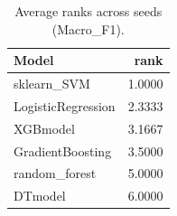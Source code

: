 \begin{table}[t]
\centering
\begin{tabular}{lr}
\toprule
Model & rank \\
\midrule
sklearn_SVM & 1.0000 \\
LogisticRegression & 2.3333 \\
XGBmodel & 3.1667 \\
GradientBoosting & 3.5000 \\
random_forest & 5.0000 \\
DTmodel & 6.0000 \\
\bottomrule
\end{tabular}
\caption{Average ranks across seeds (Macro_F1).}
\label{tab:avg_rank_Macro_F1}
\end{table}